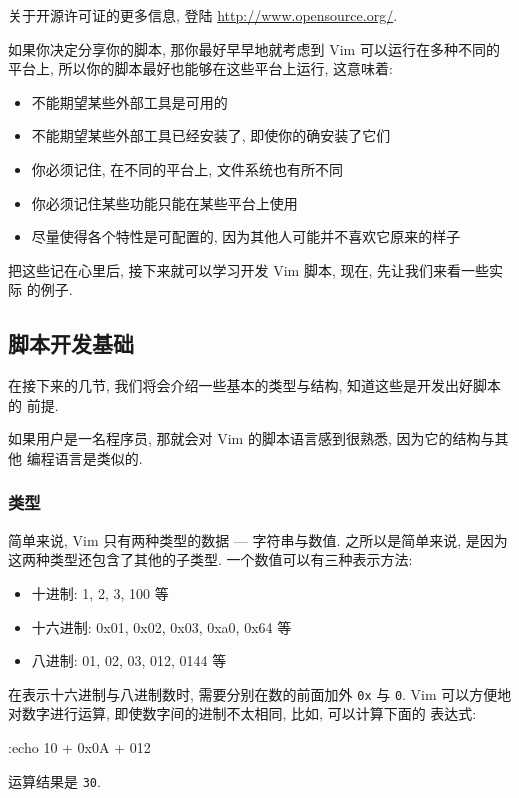 \begin{warning}
    关于开源许可证的更多信息, 登陆 \url{http://www.opensource.org/}.
\end{warning}

如果你决定分享你的脚本, 那你最好早早地就考虑到 Vim 可以运行在多种不同的平台上,
所以你的脚本最好也能够在这些平台上运行, 这意味着:
\begin{itemize}
    \item 不能期望某些外部工具是可用的
    \item 不能期望某些外部工具已经安装了, 即使你的确安装了它们
    \item 你必须记住, 在不同的平台上, 文件系统也有所不同
    \item 你必须记住某些功能只能在某些平台上使用
    \item 尽量使得各个特性是可配置的, 因为其他人可能并不喜欢它原来的样子
\end{itemize}

把这些记在心里后, 接下来就可以学习开发 Vim 脚本, 现在, 先让我们来看一些实际
的例子.

\subsection{脚本开发基础}
\label{subsec:script_writing_basics}

在接下来的几节, 我们将会介绍一些基本的类型与结构, 知道这些是开发出好脚本的
前提.

如果用户是一名程序员, 那就会对 Vim 的脚本语言感到很熟悉, 因为它的结构与其他
编程语言是类似的.

\subsubsection{类型}
\label{subsubsec:types}

简单来说, Vim 只有两种类型的数据 --- 字符串与数值. 之所以是简单来说, 是因为
这两种类型还包含了其他的子类型. 一个数值可以有三种表示方法:
\begin{itemize}
    \item 十进制: 1, 2, 3, 100 等
    \item 十六进制: 0x01, 0x02, 0x03, 0xa0, 0x64 等
    \item 八进制: 01, 02, 03, 012, 0144 等
\end{itemize}

在表示十六进制与八进制数时, 需要分别在数的前面加外 \texttt{0x} 与 \texttt{0}.
Vim 可以方便地对数字进行运算, 即使数字间的进制不太相同, 比如, 可以计算下面的
表达式:
\begin{vimcode}
:echo 10 + 0x0A + 012
\end{vimcode}
运算结果是 \texttt{30}.

